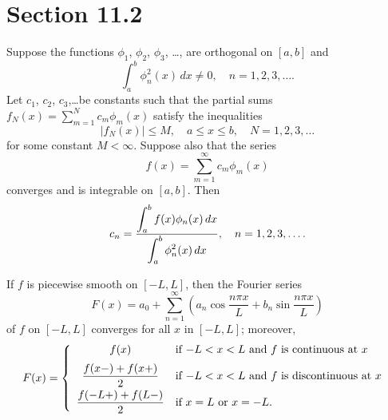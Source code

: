 \section*{Section 11.2}
\setcounter{chapter}{11}
\setcounter{section}{2}

\setcounter{theorem}{0}
\setcounter{equation}{0}
\begin{theorem}
  \label{thmtype:11.2.1} Suppose the functions $\phi_{1}$, $\phi_{2}$, $\phi_{3}$, \dots, are
  orthogonal on $[a,b]$ and
  \begin{equation}
    \label{eq:11.2.1}\int_{a}^{b}\phi_{n}^{2}(x)\,dx\ne0,\quad n=1,2,3,\dots.
  \end{equation}
  Let $c_{1}$, $c_{2}$, $c_{3}$,\dots be constants such that the partial sums
  $f_{N}(x)=\sum_{m=1}^{N}c_{m}\phi_{m}(x)$ satisfy the inequalities
  \[
    |f_{N}(x)|\le M,\quad a\le x\le b,\quad N=1,2,3,\dots
  \]
  for some constant $M<\infty$. Suppose also that the series
  \begin{equation}
    \label{eq:11.2.2}f(x)=\sum_{m=1}^{\infty}c_{m}\phi_{m}(x)
  \end{equation}
  converges and is integrable on $[a,b]$. Then
  \begin{equation}
    \label{eq:11.2.3}c_{n}=\frac{\displaystyle\int_{a}^{b}f(x)\phi_{n}(x)\,dx}{\displaystyle\int_{a}^{b}\phi_{n}^{2}(x)\,dx},\quad n=1,2,3,\dots.
  \end{equation}
\end{theorem}

\setcounter{theorem}{3}
\setcounter{equation}{7}
\begin{theorem}
  \label{thmtype:11.2.4} If $f$ is piecewise smooth on $[-L,L]$, then the Fourier series
  \begin{equation}
    \label{eq:11.2.8}F(x)=a_{0}+\sum_{n=1}^{\infty}\left(a_{n}\cos\frac{n\pi x}{L}+b_{n}\sin\frac{n\pi x}{L}\right)
  \end{equation}
  of $f$ on $[-L,L]$ converges for all $x$ in $[-L,L]$; moreover,
  \[
    F(x)= \left\{
    \begin{array}{cl}
      f(x)                       & \mbox{if $-L<x<L$ and $f$ is continuous at $x$ }    \\[2\jot]
      \displaystyle\frac{f(x-)+f(x+)}{2}  & \mbox{if $-L<x<L$ and $f$ is discontinuous at $x$ } \\[2\jot]
      \displaystyle\frac{f(-L+)+f(L-)}{2} & \mbox{if $x=L$ or $x=-L$.}
    \end{array}\right.
  \]
\end{theorem}


